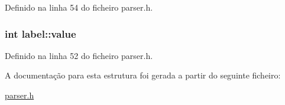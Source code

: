 Definido na linha 54 do ficheiro parser.\-h.

\hypertarget{structlabel_ac0cdaf20932b7fe75988a1d08510b72c}{
\subsubsection[{value}]{\setlength{\rightskip}{0pt plus 5cm}int label\-::value}}\label{structlabel_ac0cdaf20932b7fe75988a1d08510b72c}


Definido na linha 52 do ficheiro parser.\-h.



A documentação para esta estrutura foi gerada a partir do seguinte ficheiro\-:\begin{DoxyCompactItemize}
\item 
\hyperlink{parser_8h}{parser.\-h}\end{DoxyCompactItemize}
